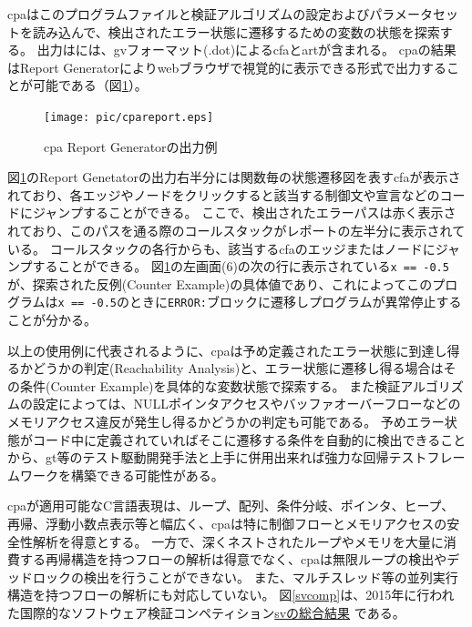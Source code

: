 \par
\acrshort{cpa}はこのプログラムファイルと検証アルゴリズムの設定およびパラメータセットを読み込んで、検出されたエラー状態に遷移するための変数の状態を探索する。
出力はには、\acrshort{gv}フォーマット(.dot)による\acrshort{cfa}と\acrshort{art}が含まれる。
\acrshort{cpa}の結果はReport Generatorによりwebブラウザで視覚的に表示できる形式で出力することが可能である（図\ref{cpareport}）。
\begin{figure}[ht]
  \centering
  \texttt{[image: pic/cpareport.eps]}
  \caption{\acrshort{cpa} Report Generatorの出力例}
  \label{cpareport}
\end{figure}
\par
図\ref{cpareport}のReport Genetatorの出力右半分には関数毎の状態遷移図を表す\acrshort{cfa}が表示されており、各エッジやノードをクリックすると該当する制御文や宣言などのコードにジャンプすることができる。
ここで、検出されたエラーパスは赤く表示されており、このパスを通る際のコールスタックがレポートの左半分に表示されている。
コールスタックの各行からも、該当する\acrshort{cfa}のエッジまたはノードにジャンプすることができる。
図\ref{cpareport}の左画面(6)の次の行に表示されている\verb|x == -0.5|が、探索された反例(Counter Example)の具体値であり、これによってこのプログラムは\verb|x == -0.5|のときに\verb|ERROR:|ブロックに遷移しプログラムが異常停止することが分かる。
\par
以上の使用例に代表されるように、\acrshort{cpa}は予め定義されたエラー状態に到達し得るかどうかの判定(Reachability Analysis)と、エラー状態に遷移し得る場合はその条件(Counter Example)を具体的な変数状態で探索する。
また検証アルゴリズムの設定によっては、NULLポインタアクセスやバッファオーバーフローなどのメモリアクセス違反が発生し得るかどうかの判定も可能である。
予めエラー状態がコード中に定義されていればそこに遷移する条件を自動的に検出できることから、\acrshort{gt}等のテスト駆動開発手法と上手に併用出来れば強力な回帰テストフレームワークを構築できる可能性がある。
\par
\acrshort{cpa}が適用可能なC言語表現は、ループ、配列、条件分岐、ポインタ、ヒープ、再帰、浮動小数点表示等と幅広く、\acrshort{cpa}は特に制御フローとメモリアクセスの安全性解析を得意とする。
一方で、深くネストされたループやメモリを大量に消費する再帰構造を持つフローの解析は得意でなく、\acrshort{cpa}は無限ループの検出やデッドロックの検出を行うことができない。
また、マルチスレッド等の並列実行構造を持つフローの解析にも対応していない。
図\ref{svcomp}は、2015年に行われた国際的なソフトウェア検証コンペティション\href{http://sv-comp.sosy-lab.org/2015/results/index.php}{\gls{sv}の総合結果} \cite{sv}である。
